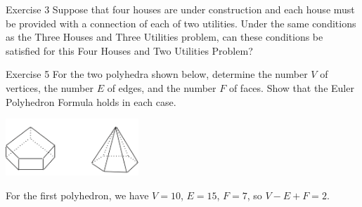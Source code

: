 \documentclass[12pt]{extarticle}
\title{}
\author{Avinash Iyer}
\date{}
\begin{document}
{
  \begin{problem}{Exercise 3}
    Suppose that four houses are under construction and each house must be provided with a connection of each of two utilities. Under the same conditions as the Three Houses and Three Utilities problem, can these conditions be satisfied for this Four Houses and Two Utilities Problem?
    \tcblower
    \begin{center}
    \end{center}
  \end{problem}
  \begin{problem}{Exercise 5}
    For the two polyhedra shown below, determine the number $V$ of vertices, the number $E$ of edges, and the number $F$ of faces. Show that the Euler Polyhedron Formula holds in each case.
    \begin{center}
      \includegraphics[width=5cm]{exercise_5}
    \end{center}
    \tcblower
    For the first polyhedron, we have $V = 10$, $E = 15$, $F = 7$, so $V-E+F = 2$.\\


\end{problem}}
\end{document}
